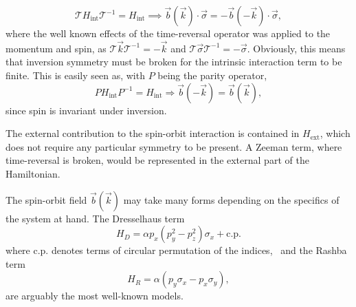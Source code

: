 \begin{equation}
  \mathcal{T} H_\text{int} \mathcal{T} ^{-1} = H_\text{int}
  \implies 
  \vec{b}(\vec{k}) \cdot \vec{\sigma} = -\vec{b}(-\vec{k}) \cdot \vec{\sigma},
\end{equation}
where the well known effects of the time-reversal operator was applied to the momentum and spin, as $\mathcal{T} \vec{k} \mathcal{T} ^{-1} = -\vec{k}$ and $\mathcal{T} \vec{\sigma} \mathcal{T} ^{-1} = -\vec{\sigma}$.
Obviously, this means that inversion symmetry must be broken for the intrinsic interaction term  to be finite.
This is easily seen as, with $P$ being the parity operator,
\begin{equation}
  P H_\text{int} P^{-1} = H_\text{int} \Rightarrow
  \vec{b}(-\vec{k}) = \vec{b}(\vec{k}),
\end{equation}
since spin is invariant under inversion.


The external contribution to the spin-orbit interaction is contained in $H_\text{ext}$, which does not require any particular symmetry to be present.
A Zeeman term, where time-reversal is broken, would be represented in the external part of the Hamiltonian.


The spin-orbit field $\vec{b}(\vec{k})$ may take many forms depending on the specifics of the system at hand.
The Dresselhaus term
\begin{equation}
  H_D = \alpha p_x (p_y^2 - p_z^2) \sigma_x + \text{c.p.}
\end{equation}
where c.p. denotes terms of circular permutation of the indices,~\cite{manchonNewPerspectivesRashba2015} and the Rashba term~\cite{wuTwoDimensionalGiantTunable2020}
\begin{equation}\label{eq:rashba}
  H_R = \alpha (p_y \sigma_x - p_x \sigma_y),
\end{equation}
are arguably the most well-known models.

